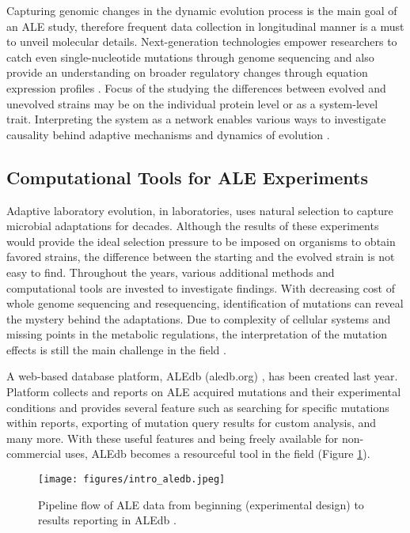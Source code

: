 Capturing genomic changes in the dynamic evolution process is the main goal of an ALE study, therefore frequent data collection in longitudinal manner is a must to unveil molecular details. Next-generation technologies empower researchers to catch even single-nucleotide mutations through genome sequencing and also provide an understanding on broader regulatory changes through equation expression profiles \cite{conrad2011microbial}. Focus of the studying the differences between evolved and unevolved strains may be on the individual protein level or as a system-level trait. Interpreting the system as a network enables various ways to investigate causality behind adaptive mechanisms and dynamics of evolution \cite{soyer2013evolutionary, long2018adaptive}.

\subsection{Computational Tools for ALE Experiments}

Adaptive laboratory evolution, in laboratories, uses natural selection to capture microbial adaptations for decades. Although the results of these experiments would provide the ideal selection pressure to be imposed on organisms to obtain favored strains, the difference between the starting and the evolved strain is not easy to find. Throughout the years, various additional methods and computational tools are invested to investigate findings. With decreasing cost of whole genome sequencing and resequencing, identification of mutations can reveal the mystery behind the adaptations. Due to complexity of cellular systems and missing points in the metabolic regulations, the interpretation of the mutation effects is still the main challenge in the field \cite{palsson2011adaptive}.

A web-based database platform, ALEdb (aledb.org) \cite{phaneuf2019aledb}, has been created last year. Platform collects and reports on ALE acquired mutations and their experimental conditions and provides several feature such as searching for specific mutations within reports, exporting of mutation query results for custom analysis, and many more. With these useful features and being freely available for non-commercial uses, ALEdb becomes a resourceful tool in the field (Figure \ref{fig:intro_aledb}).
\vspace{1cm}
\begin{figure}[H]
\begin{center}
\texttt{[image: figures/intro\_aledb.jpeg]}
\caption[Pipeline flow of ALE data from beginning (experimental design) to results reporting in ALEdb \cite{phaneuf2019aledb}.]{Pipeline flow of ALE data from beginning (experimental design) to results reporting in ALEdb \cite{phaneuf2019aledb}.}
\label{fig:intro_aledb}
\end{center}
\end{figure}

